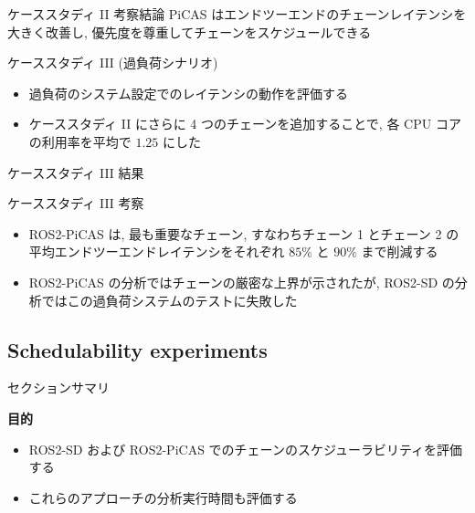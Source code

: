 \begin{frame}{ケーススタディ II 考察結論}
    PiCAS はエンドツーエンドのチェーンレイテンシを大きく改善し, 優先度を尊重してチェーンをスケジュールできる
\end{frame}


\begin{frame}{ケーススタディ III (過負荷シナリオ)}
    \begin{itemize}
        \item 過負荷のシステム設定でのレイテンシの動作を評価する
        \item ケーススタディ II にさらに 4 つのチェーンを追加することで, 各 CPU コアの利用率を平均で $1.25$ にした
    \end{itemize}
\end{frame}

\begin{frame}{ケーススタディ III 結果}
\end{frame}

\begin{frame}{ケーススタディ III 考察}
    \begin{itemize}
        \item ROS2-PiCAS は, 最も重要なチェーン, すなわちチェーン 1 とチェーン 2 の平均エンドツーエンドレイテンシをそれぞれ $85 \%$ と $90 \%$ まで削減する
        \item ROS2-PiCAS の分析ではチェーンの厳密な上界が示されたが, ROS2-SD の分析ではこの過負荷システムのテストに失敗した
    \end{itemize}
\end{frame}


\subsection{Schedulability experiments}
\label{ssec: schedulability experiments}

\begin{frame}{セクションサマリ}
    \begin{itembox}[l]{\textbf{目的}}
        \begin{itemize}
            \item ROS2-SD および ROS2-PiCAS でのチェーンのスケジューラビリティを評価する
            \item これらのアプローチの分析実行時間も評価する
        \end{itemize}
    \end{itembox}
\end{frame}

